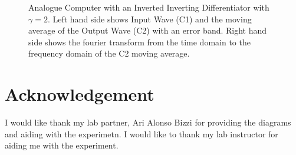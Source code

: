 \documentclass[journal]{Imperial_lab_report}
\begin{document}
\begin{appendices}
\begin{figure}
            \caption{Analogue Computer with an Inverted Inverting Differentiator with $\gamma = 2$. Left hand side shows Input Wave (C1) and the moving average of the Output Wave (C2) with an error band. Right hand side shows the fourier transform from the time domain to the frequency domain of the C2 moving average.}
        \end{figure}
        \clearpage
    \end{appendices}
    \section{Acknowledgement}
    I would like thank my lab partner, Ari Alonso Bizzi for providing the diagrams and aiding with the experimetn. I would like to thank my lab instructor for aiding me with the experiment.
        
    
    
\end{document}
